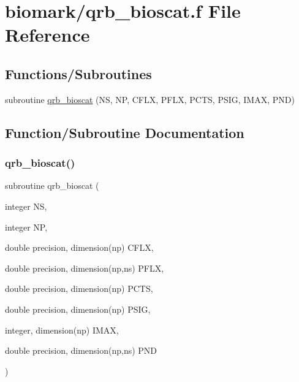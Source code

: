 \hypertarget{qrb__bioscat_8f}{}\section{biomark/qrb\+\_\+bioscat.f File Reference}
\label{qrb__bioscat_8f}
\subsection*{Functions/\+Subroutines}
\begin{DoxyCompactItemize}
\item 
subroutine \hyperlink{qrb__bioscat_8f_afa6eff8b4fb5949f72361d1fdd64505a}{qrb\+\_\+bioscat} (NS, NP, C\+F\+LX, P\+F\+LX, P\+C\+TS, P\+S\+IG, I\+M\+AX, P\+ND)
\end{DoxyCompactItemize}


\subsection{Function/\+Subroutine Documentation}
\mbox{\label{qrb__bioscat_8f_afa6eff8b4fb5949f72361d1fdd64505a}} 
\subsubsection{\texorpdfstring{qrb\+\_\+bioscat()}{qrb\_bioscat()}}
{\footnotesize\ttfamily subroutine qrb\+\_\+bioscat (\begin{DoxyParamCaption}\item[{integer}]{NS,  }\item[{integer}]{NP,  }\item[{double precision, dimension(np)}]{C\+F\+LX,  }\item[{double precision, dimension(np,ns)}]{P\+F\+LX,  }\item[{double precision, dimension(np)}]{P\+C\+TS,  }\item[{double precision, dimension(np)}]{P\+S\+IG,  }\item[{integer, dimension(np)}]{I\+M\+AX,  }\item[{double precision, dimension(np,ns)}]{P\+ND }\end{DoxyParamCaption})}

